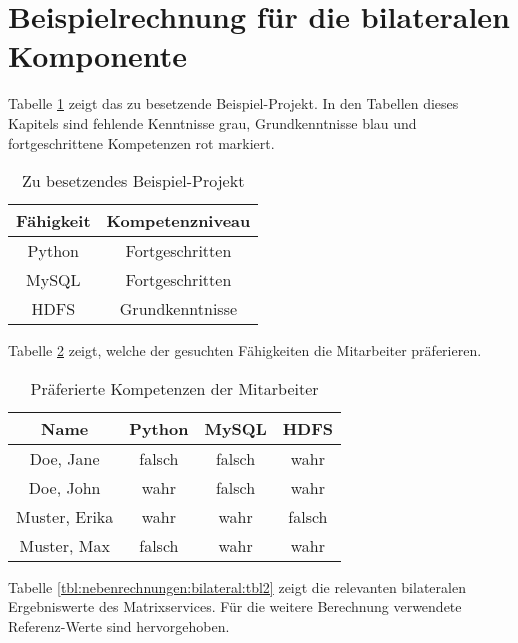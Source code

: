 \section{Beispielrechnung für die bilateralen Komponente}
\label{ch:nebenrechnungen:bilateral}
Tabelle \ref{tbl:nebenrechnungen:bilateral:tbl1} zeigt das zu besetzende Beispiel-Projekt. In den Tabellen dieses Kapitels sind fehlende Kenntnisse grau, Grundkenntnisse blau und fortgeschrittene Kompetenzen rot markiert.
\begin{table}[h]
	\centering
	\begin{tabular}{c|c}
		Fähigkeit & Kompetenzniveau \\
		\hline
		Python  & \cellcolor{usercolor}Fortgeschritten\\
		MySQL   & \cellcolor{usercolor}Fortgeschritten\\
		HDFS    & \cellcolor{itemcolor}Grundkenntnisse
	\end{tabular}
	\caption{Zu besetzendes Beispiel-Projekt}
	\label{tbl:nebenrechnungen:bilateral:tbl1}
\end{table}

Tabelle \ref{tbl:nebenrechnungen:bilateral:tbl3} zeigt, welche der gesuchten Fähigkeiten die Mitarbeiter präferieren.
\begin{table}[h]
	\centering
	\begin{tabular}{c|c|c|c}
		Name & Python & MySQL & HDFS \\
		\hline
		Doe, Jane     & \cellcolor{usercolor}falsch & \cellcolor{usercolor}falsch & \cellcolor{itemcolor}wahr\\
		Doe, John     & \cellcolor{itemcolor}wahr   & \cellcolor{itemcolor}falsch   & \cellcolor{itemcolor}wahr\\
		Muster, Erika & \cellcolor{itemcolor}wahr   & \cellcolor{usercolor}wahr & \cellcolor{usercolor}falsch\\
		Muster, Max   & \cellcolor{usercolor}falsch & \cellcolor{itemcolor}wahr   & \cellcolor{itemcolor}wahr
	\end{tabular}
	\caption{Präferierte Kompetenzen der Mitarbeiter}
	\label{tbl:nebenrechnungen:bilateral:tbl3}
\end{table}

Tabelle \ref{tbl:nebenrechnungen:bilateral:tbl2} zeigt die relevanten bilateralen Ergebniswerte des Matrixservices. Für die weitere Berechnung verwendete Referenz-Werte sind hervorgehoben.

